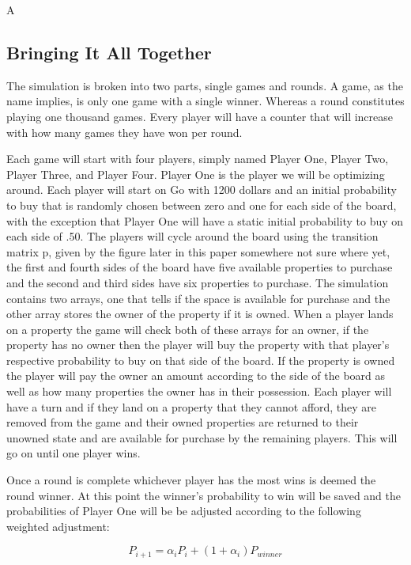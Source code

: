 \documentclass{article}
\begin{document}
A

\subsection{Bringing It All Together}

The simulation is broken into two parts, single games and rounds.  A game, as the name implies, is only one game with a single winner.  Whereas a round constitutes playing one thousand games.  Every player will have a counter that will increase with how many games they have won per round.

Each game will start with four players, simply named Player One, Player Two, Player Three, and Player Four.  Player One is the player we will be optimizing around.  Each player will start on Go with 1200 dollars and an initial probability to buy that is randomly chosen between zero and one for each side of the board, with the exception that Player One will have a static initial probability to buy on each side of .50.  The players will cycle around the board using the transition matrix p, given by the figure later in this paper somewhere not sure where yet, the first and fourth sides of the board have five available properties to purchase and the second and third sides have six properties to purchase.  The simulation contains two arrays, one that tells if the space is available for purchase and the other array stores the owner of the property if it is owned.  When a player lands on a property the game will check both of these arrays for an owner, if the property has no owner then the player will buy the property with that player’s respective probability to buy on that side of the board.  If the property is owned the player will pay the owner an amount according to the side of the board as well as how many properties the owner has in their possession.  Each player will have a turn and if they land on a property that they cannot afford, they are removed from the game and their owned properties are returned to their unowned state and are available for purchase by the remaining players.  This will go on until one player wins.  

Once a round is complete whichever player has the most wins is deemed the round winner.  At this point the winner’s probability to win will be saved and the probabilities of Player One will be be adjusted according to the following weighted adjustment:

\begin{equation}
    \label{probability_adjustment}
    P_{i+1} = \alpha_i P_i + (1+\alpha_i)P_{winner}
\end{equation}
\end{document}
